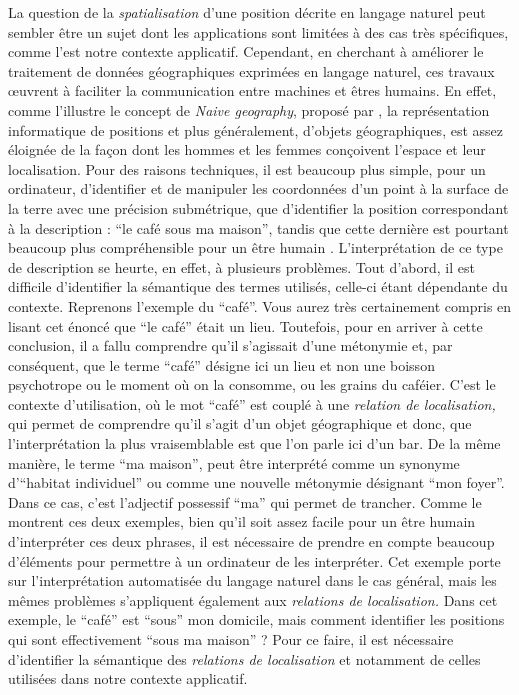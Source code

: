 La question de la \emph{spatialisation} d'une position décrite en
langage naturel peut sembler être un sujet dont les applications sont
limitées à des cas très spécifiques, comme l'est notre contexte
applicatif. Cependant, en cherchant à améliorer le traitement de
données géographiques exprimées en langage naturel, ces travaux
œuvrent à faciliter la communication entre machines et êtres
humains. En effet, comme l'illustre le concept de \emph{Naive
  geography}, proposé par \textcite{Egenhofer1995}, la représentation
informatique de positions et plus généralement, d'objets
géographiques, est assez éloignée de la façon dont les hommes et les
femmes conçoivent l'espace et leur localisation. Pour des raisons
techniques, il est beaucoup plus simple, pour un ordinateur,
d'identifier et de manipuler les coordonnées d'un point à la surface
de la terre avec une précision submétrique, que d'identifier la
position correspondant à la description : \enquote{le café sous ma
  maison}, tandis que cette dernière est pourtant beaucoup plus
compréhensible pour un être humain
\autocite{Duchene2019}. L'interprétation de ce type de description se
heurte, en effet, à plusieurs problèmes. Tout d'abord, il est
difficile d'identifier la sémantique des termes utilisés, celle-ci
étant dépendante du contexte. Reprenons l'exemple du
\enquote{café}. Vous aurez très certainement compris en lisant cet
énoncé que \enquote{le café} était un lieu. Toutefois, pour en arriver
à cette conclusion, il a fallu comprendre qu'il s'agissait d'une
métonymie et, par conséquent, que le terme \enquote{café} désigne ici
un lieu et non une boisson psychotrope ou le moment où on la consomme,
ou les grains du caféier. C'est le contexte d’utilisation, où le mot
\enquote{café} est couplé à une \emph{relation de localisation,} qui
permet de comprendre qu'il s'agit d'un objet géographique et donc, que
l'interprétation la plus vraisemblable est que l'on parle ici d'un
bar. De la même manière, le terme \enquote{ma maison}, peut être
interprété comme un synonyme d'\enquote{habitat individuel} ou comme
une nouvelle métonymie désignant \enquote{mon foyer}. Dans ce cas,
c'est l'adjectif possessif \enquote{ma} qui permet de trancher. Comme
le montrent ces deux exemples, bien qu'il soit assez facile pour un
être humain d'interpréter ces deux phrases, il est nécessaire de
prendre en compte beaucoup d'éléments pour permettre à un ordinateur
de les interpréter. Cet exemple porte sur l'interprétation automatisée
du langage naturel dans le cas général, mais les mêmes problèmes
s'appliquent également aux \emph{relations de localisation.} Dans cet
exemple, le \enquote{café} est \enquote{sous} mon domicile, mais
comment identifier les positions qui sont effectivement \enquote{sous
  ma maison} ? Pour ce faire, il est nécessaire d'identifier la
sémantique des \emph{relations de localisation} et notamment de celles
utilisées dans notre contexte applicatif.

